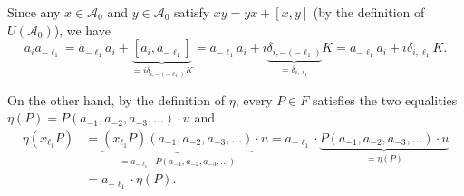 \documentclass[etingof-lie.tex]{subfiles}
\begin{document}
Since any $x\in\mathcal{A}_{0}$ and $y\in\mathcal{A}_{0}$ satisfy
$xy=yx+\left[  x,y\right]  $ (by the definition of $U\left(  \mathcal{A}%
_{0}\right)  $), we have%
\[
a_{i}a_{-\ell_{1}}=a_{-\ell_{1}}a_{i}+\underbrace{\left[  a_{i},a_{-\ell_{1}%
}\right]  }_{=i\delta_{i,-\left(  -\ell_{1}\right)  }K}=a_{-\ell_{1}}%
a_{i}+i\underbrace{\delta_{i,-\left(  -\ell_{1}\right)  }}_{=\delta
_{i,\ell_{1}}}K=a_{-\ell_{1}}a_{i}+i\delta_{i,\ell_{1}}K.
\]


On the other hand, by the definition of $\eta$, every $P\in F$ satisfies the
two equalities $\eta\left(  P\right)  =P\left(  a_{-1},a_{-2},a_{-3}%
,...\right)  \cdot u$ and%
\begin{align}
\eta\left(  x_{\ell_{1}}P\right)   &  =\underbrace{\left(  x_{\ell_{1}%
}P\right)  \left(  a_{-1},a_{-2},a_{-3},...\right)  }_{=a_{-\ell_{1}}\cdot
P\left(  a_{-1},a_{-2},a_{-3},...\right)  }\cdot u=a_{-\ell_{1}}%
\cdot\underbrace{P\left(  a_{-1},a_{-2},a_{-3},...\right)  \cdot u}%
_{=\eta\left(  P\right)  }\nonumber\\
&  =a_{-\ell_{1}}\cdot\eta\left(  P\right)  . \label{lem.V=F.pf.5}%
\end{align}
\end{document}
